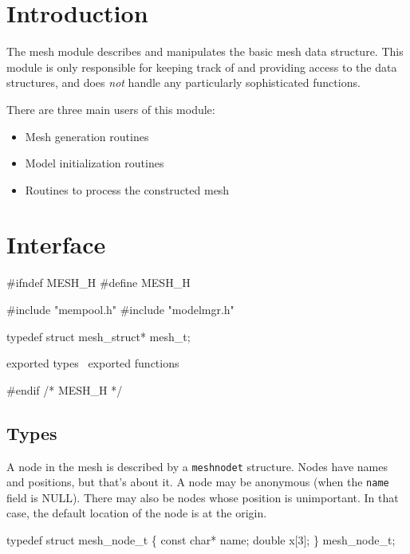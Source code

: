 
\section{Introduction}

The mesh module describes and manipulates the basic mesh data
structure.  This module is only responsible for keeping track
of and providing access to the data structures, and does
\emph{not} handle any particularly sophisticated functions.

There are three main users of this module:
\begin{itemize}
 \item Mesh generation routines
 \item Model initialization routines
 \item Routines to process the constructed mesh
\end{itemize}


\section{Interface}

\endmoddef
#ifndef MESH_H
#define MESH_H

#include "mempool.h"
#include "modelmgr.h"

typedef struct mesh_struct* mesh_t;

\LA{}exported types~{\nwtagstyle{}}\RA{}
\LA{}exported functions~{\nwtagstyle{}}\RA{}

#endif /* MESH_H */
\nwendcode{}\nwdocspar


\subsection{Types}

A node in the mesh is described by a {\tt{}mesh{}node{}t} structure.
Nodes have names and positions, but that's about it.  A node may %
be anonymous (when the {\tt{}name} field is NULL).  There may also
be nodes whose position is unimportant.  In that case, the default
location of the node is at the origin.

\nwenddocs{}\endmoddef
typedef struct mesh_node_t \{
    const char* name;
    double x[3];
\} mesh_node_t;

